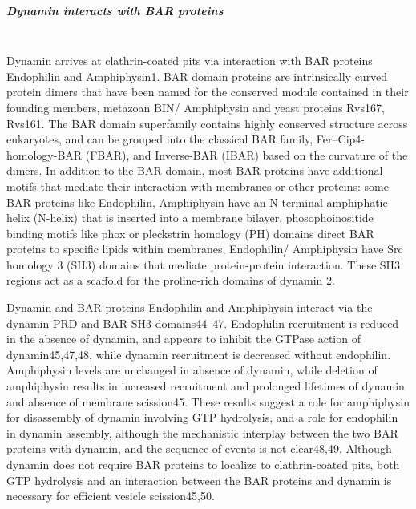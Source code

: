 	\subparagraph{Dynamin interacts with BAR proteins}
\mbox{} \\
Dynamin arrives at clathrin-coated pits via interaction with BAR proteins Endophilin and Amphiphysin1. BAR domain proteins are intrinsically curved protein dimers that have been named for the conserved module contained in their founding members, metazoan BIN/ Amphiphysin and yeast proteins Rvs167, Rvs161. The BAR domain superfamily contains highly conserved structure across eukaryotes, and can be grouped into the classical BAR family, Fer–Cip4-homology-BAR (FBAR), and Inverse-BAR (IBAR) based on the curvature of the dimers. In addition to the BAR domain, most BAR proteins have additional motifs that mediate their interaction with membranes or other proteins: some BAR proteins like Endophilin, Amphiphysin have an N-terminal amphiphatic helix (N-helix) that is inserted into a membrane bilayer, phosophoinositide binding motifs like phox or pleckstrin homology (PH) domains direct BAR proteins to specific lipids within membranes, Endophilin/ Amphiphysin have Src homology 3 (SH3) domains that mediate protein-protein interaction. These SH3 regions act as a scaffold for the proline-rich domains of dynamin 2. 


\vspace{5mm}
Dynamin and BAR proteins Endophilin and Amphiphysin interact via the dynamin PRD and BAR SH3 domains44–47. Endophilin recruitment is reduced in the absence of dynamin, and appears to inhibit the GTPase action of dynamin45,47,48, while dynamin recruitment is decreased without endophilin. Amphiphysin levels are unchanged in absence of dynamin, while deletion of amphiphysin results in increased recruitment and prolonged lifetimes of dynamin and absence of membrane scission45. These results suggest a role for amphiphysin for disassembly of dynamin involving GTP hydrolysis, and a role for endophilin in dynamin assembly, although the mechanistic interplay between the two BAR proteins with dynamin, and the sequence of events is not clear48,49. Although dynamin does not require BAR proteins to localize to clathrin-coated pits, both GTP hydrolysis and an interaction between the BAR proteins and dynamin is necessary for efficient vesicle scission45,50.





